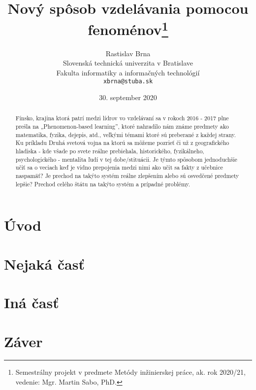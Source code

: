 \documentclass[10pt,twoside,slovak,a4paper]{article}
\title{Nový spôsob vzdelávania pomocou fenoménov\thanks{Semestrálny projekt v predmete Metódy inžinierskej práce, ak. rok 2020/21, vedenie: Mgr. Martin Sabo, PhD.}} %
\author{Rastislav Brna\\[2pt]
	{\small Slovenská technická univerzita v Bratislave}\\
	{\small Fakulta informatiky a informačných technológií}\\
	{\small \texttt{xbrna@stuba.sk}}
	}
\date{\small 30. september 2020} %
\begin{document}
\maketitle

\begin{abstract}
	Fínsko, krajina ktorá patrí medzi lídrov vo vzdelávaní sa v rokoch 2016 - 2017 plne prešla na
	„Phenomenon-based learning”, ktoré nahradilo nám známe predmety ako matematika,
	fyzika, dejepis, atd., veľkými témami ktoré sú preberané z každej strany. Ku príkladu Druhá
	svetová vojna na ktorú sa môžeme pozrieť či už z geografického hladiska - kde všade po
	svete reálne prebiehala, historického, fyzikálneho, psychologického - mentalita ľudí v tej
	dobe/stituácii.  Je týmto spôsobom jednoduchšie učiť sa o veciach keď je vidno prepojenia
	medzi nimi ako učit sa fakty z učebnice naspamäť? Je prechod na takýto systém reálne
	zlepšením alebo sú osvedčené predmety lepšie? Prechod celého štátu na takýto systém a
	prípadné problémy.
\end{abstract}



\section{Úvod}




\section{Nejaká časť} \label{nejaka}




\section{Iná časť} \label{ina}




\section{Záver} \label{zaver} %






\end{document}
